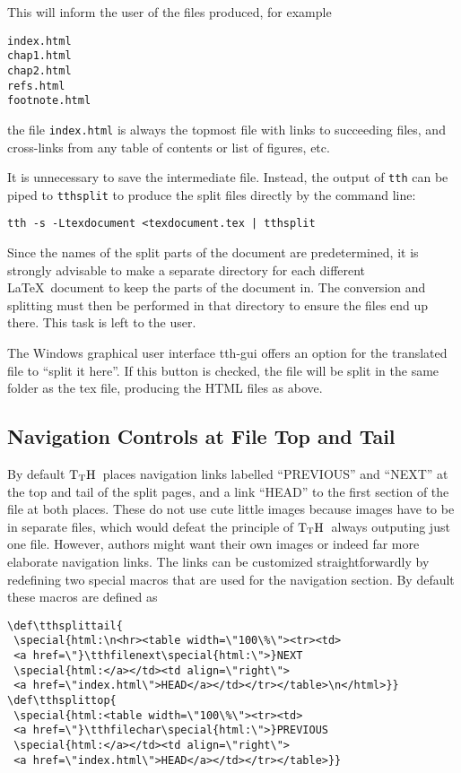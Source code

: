 \documentclass[12pt]{article}
\def\TtH{$\rm{}T_TH$}
\begin{document}
\noindent This will inform the user of the files produced, for
example

\begin{verbatim}
index.html
chap1.html
chap2.html
refs.html
footnote.html
\end{verbatim}

\noindent the file \verb!index.html! is always the topmost file with
links to succeeding files, and cross-links from any table of contents
or list of figures, etc. 

It is unnecessary to save the intermediate file. Instead, the output
of \verb!tth! can be piped to \verb!tthsplit! to produce the split
files directly by the command line:

\begin{verbatim}
tth -s -Ltexdocument <texdocument.tex | tthsplit
\end{verbatim}

Since the names of the split parts of the document are predetermined,
it is strongly advisable to make a separate directory for each
different \LaTeX\ document to keep the parts of the document in. The
conversion and splitting must then be performed in that directory to
ensure the files end up there. This task is left to the user.

The Windows graphical user interface tth-gui offers an option for
the translated file to ``split it here''. If this button is checked,
the file will be split in the same folder as the tex file, producing
the HTML files as above.

\subsection{Navigation Controls at File Top and Tail}

By default \TtH\ places navigation links labelled ``PREVIOUS'' and
``NEXT'' at the top and tail of the split pages, and a link ``HEAD''
to the first section of the file at both places. These do not use cute
little images because images have to be in separate files, which would
defeat the principle of \TtH\ always outputing just one file. However,
authors might want their own images or indeed far more elaborate
navigation links. The links can be customized straightforwardly by
redefining two special macros that are used for the navigation
section. By default these macros are defined as
\begin{verbatim}
\def\tthsplittail{
 \special{html:\n<hr><table width=\"100\%\"><tr><td>
 <a href=\"}\tthfilenext\special{html:\">}NEXT
 \special{html:</a></td><td align=\"right\">
 <a href=\"index.html\">HEAD</a></td></tr></table>\n</html>}}
\def\tthsplittop{
 \special{html:<table width=\"100\%\"><tr><td>
 <a href=\"}\tthfilechar\special{html:\">}PREVIOUS
 \special{html:</a></td><td align=\"right\">
 <a href=\"index.html\">HEAD</a></td></tr></table>}}
\end{verbatim}
\end{document}
